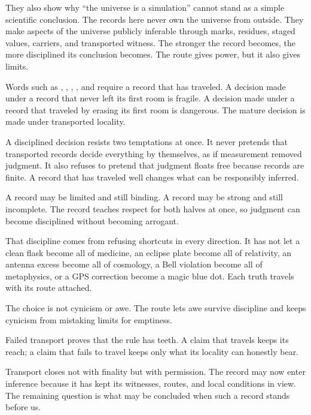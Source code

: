 \begin{movementclose}
They also show why ``the universe is a simulation'' cannot stand as a
simple scientific conclusion. The records here never own the universe
from outside. They make aspects of the universe publicly inferable
through marks, residues, staged values, carriers, and transported
witness. The stronger the record becomes, the more disciplined its
conclusion becomes. The route gives power, but it also gives limits.

Words such as , , ,
, and  require a record that has traveled.
A decision made under a record that never left its first room is
fragile. A decision made under a record that traveled by erasing its
first room is dangerous. The mature decision is made under transported
locality.

A disciplined decision resists two temptations at once. It never
pretends that transported records decide everything by themselves, as
if measurement removed judgment. It also refuses to pretend that
judgment floats free because records are finite. A record that has
traveled well changes what can be responsibly inferred.

A record may be limited and still binding. A record may be strong and
still incomplete. The record teaches respect for both halves at once,
so judgment can become disciplined without becoming arrogant.

That discipline comes from refusing shortcuts in every direction. It has not let a clean flask become all of medicine,
an eclipse plate become all of relativity, an antenna excess become all
of cosmology, a Bell violation become all of metaphysics, or a GPS
correction become a magic blue dot. Each truth travels with its route
attached.

The choice is not cynicism or awe. The route lets awe survive discipline
and keeps cynicism from mistaking limits for emptiness.

Failed transport proves that the rule has teeth. A claim that travels keeps
its reach; a claim that fails to travel keeps only what its locality
can honestly bear.

Transport closes not with finality but with permission. The record may
now enter inference because it has kept its witnesses, routes, and local
conditions in view. The remaining question is what may be concluded
when such a record stands before us.
\end{movementclose}
